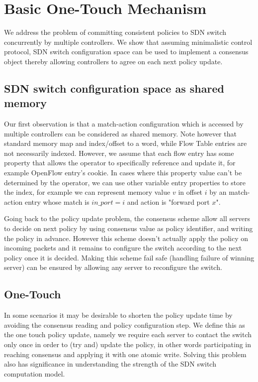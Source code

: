 \documentclass[conference]{sigcomm-alternate}
\begin{document}
\section{Basic One-Touch Mechanism}\label{sec:realization}

We address the problem of committing consistent policies to SDN switch concurrently by multiple controllers.
We show that assuming minimalistic control protocol, SDN switch configuration space can be used to implement a consensus object thereby allowing controllers to agree on each next policy update.

\subsection{SDN switch configuration space as shared memory}





Our first observation is that a match-action configuration which is accessed by multiple controllers can be considered as shared memory. Note however that standard memory map and index/offset to a word, while Flow Table entries are not necessarily indexed. However, we assume that each flow entry has some property that allows the operator to specifically reference and update it, for example OpenFlow entry's cookie. In cases where this property value can't be determined by the operator, we can use other variable entry properties to store the index, for example we can represent memory value $v$ in offset $i$ by an match-action entry whose match is $in\_port = i$ and action is "forward port $x$".


Going back to the policy update problem, the consensus scheme allow all servers to decide on next policy by using consensus value as policy identifier, and writing the policy in advance. However this scheme doesn't actually apply the policy on incoming packets and it remains to configure the switch according to the next policy once it is decided. Making this scheme fail safe (handling failure of winning server) can be ensured by allowing any server to reconfigure the switch.

\subsection{ One-Touch}

In some scenarios it may be desirable to shorten the policy update time by avoiding the consensus reading and policy configuration step. We define this as the one touch policy update, namely we require each server to contact the switch only once in order to (try and) update the policy, in other words participating in reaching consensus and applying it with one atomic write. Solving this problem also has significance in understanding the strength of the SDN switch computation model.
\end{document}
